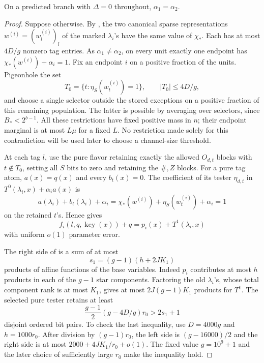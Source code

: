 \begin{lemma}
\label{lem:zero-delta}
On a predicted branch with \(\Delta=0\) throughout,
\(\alpha_1=\alpha_2\).
\end{lemma}

\begin{proof}
Suppose otherwise.  By , the two
canonical sparse representations \(w^{(i)}=(w_l^{(i)})_l\)
of the marked \(\lambda_i\)'s have the same value of \(\chi_*\).
Each has at most \(4D/g\) nonzero tag entries.
As \(\alpha_1\ne\alpha_2\), on every unit exactly one endpoint
has \(\chi_*(w^{(i)})+\alpha_i=1\).
Fix an endpoint \(i\) on a positive fraction of the units.
Pigeonhole the set
\[
 T_0=\{t:\eta_S(w_t^{(i)})=1\},
 \qquad |T_0|\le4D/g,
 \]
and choose a single selector outside the stored exceptions
on a positive fraction of this remaining population.
The latter is possible by averaging over selectors, since
\(B_*<2^{b-1}\).
All these restrictions have fixed positive mass in \(n\);
their endpoint marginal is at most \(L\mu\) for a fixed \(L\).
No restriction made solely for this contradiction will be
used later to choose a channel-size threshold.

At each tag \(l\), use the pure flavor retaining exactly the
allowed \(O_{d,t}\) blocks with \(t\notin T_0\), setting all
\(S\) bits to zero and retaining the \(\#,Z\) blocks.
For a pure tag atom, \(a(x)=q(x)\) and every \(b_t(x)=0\).
The coefficient of its tester \(\eta_{d,t}\) in
\(T^0(\lambda_i,x)+\alpha_i a(x)\) is
\[
 a(\lambda_i)+b_t(\lambda_i)+\alpha_i
 =\chi_*(w^{(i)})+\eta_S(w_t^{(i)})+\alpha_i=1
 \]
on the retained \(t\)'s.  Hence  gives
\begin{equation}
 f_i(l,q,\operatorname{key}(x))+q
 =p_i(x)+T^1(\lambda_i,x)
 \label{eq:pure-prediction}
\end{equation}
with uniform \(o(1)\) parameter error.

The right side of  is a sum of at
most
\begin{equation}
 s_1=(g-1)(h+2JK_1)
 \label{eq:synthetic-product-count}
\end{equation}
products of affine functions of the base variables.
Indeed \(p_i\) contributes at most \(h\) products in each
of the \(g-1\) star components.  Factoring the old
\(\lambda_i\)'s, whose total component rank is at most
\(K_1\), gives at most \(2J(g-1)K_1\) products for \(T^1\).
The selected pure tester retains at least
\begin{equation}
 \frac{g-1}{2}(g-4D/g)r_0>2s_1+1
 \label{eq:synthetic-tester-room}
\end{equation}
disjoint ordered bit pairs.  To check the last inequality,
use \(D=4000g\) and \(h=1000r_0\).  After division by
\((g-1)r_0\), the left side is \((g-16000)/2\) and the
right side is at most \(2000+4JK_1/r_0+o(1)\).
The fixed value \(g=10^9+1\) and the later choice of
sufficiently large \(r_0\) make the inequality hold.


\end{proof}
